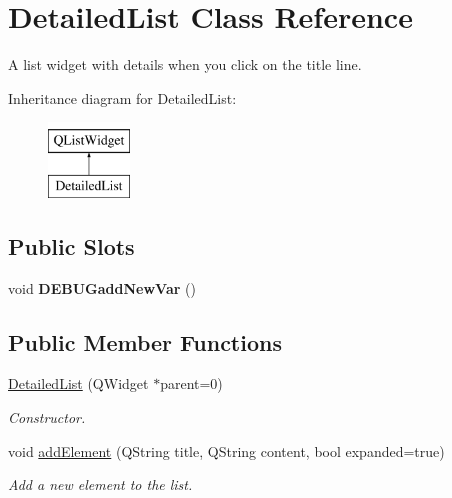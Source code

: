 \hypertarget{classDetailedList}{\section{Detailed\+List Class Reference}
\label{classDetailedList}
}


A list widget with details when you click on the title line.  


Inheritance diagram for Detailed\+List\+:\begin{figure}[H]
\begin{center}
\leavevmode
\includegraphics[height=2.000000cm]{classDetailedList}
\end{center}
\end{figure}
\subsection*{Public Slots}
\begin{DoxyCompactItemize}
\item 
\hypertarget{classDetailedList_ad425c5bda6ca07fceee56f1df6ae2cf5}{void {\bfseries D\+E\+B\+U\+Gadd\+New\+Var} ()}\label{classDetailedList_ad425c5bda6ca07fceee56f1df6ae2cf5}

\end{DoxyCompactItemize}
\subsection*{Public Member Functions}
\begin{DoxyCompactItemize}
\item 
\hyperlink{classDetailedList_a82c17dba7dd2bc10317a3b9953cf8943}{Detailed\+List} (Q\+Widget $\ast$parent=0)
\begin{DoxyCompactList}\small\item\em Constructor. \end{DoxyCompactList}\item 
void \hyperlink{classDetailedList_aed40208f4a912b1ecfd3eba7ea2c9233}{add\+Element} (Q\+String title, Q\+String content, bool expanded=true)
\begin{DoxyCompactList}\small\item\em Add a new element to the list. \end{DoxyCompactList}\end{DoxyCompactItemize}
